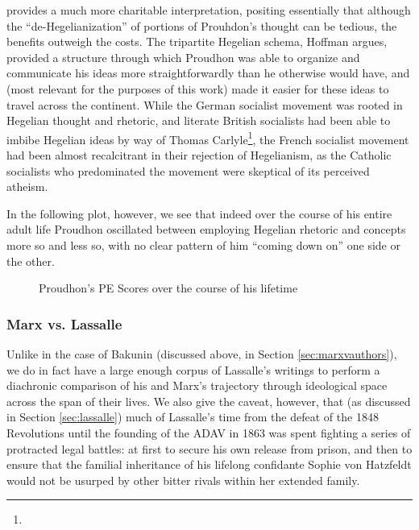 \cite{hoffman_revolutionary_1972} provides a much more charitable interpretation, positing essentially that although the ``de-Hegelianization'' of portions of Prouhdon's thought can be tedious, the benefits outweigh the costs. The tripartite Hegelian schema, Hoffman argues, provided a structure through which Proudhon was able to organize and communicate his ideas more straightforwardly than he otherwise would have, and (most relevant for the purposes of this work) made it easier for these ideas to travel across the continent. While the German socialist movement was rooted in Hegelian thought and rhetoric, and literate British socialists had been able to imbibe Hegelian ideas by way of Thomas Carlyle\footnote{}, the French socialist movement had been almost recalcitrant in their rejection of Hegelianism, as the Catholic socialists who predominated the movement were skeptical of its perceived atheism.

In the following plot, however, we see that indeed over the course of his entire adult life Proudhon oscillated between employing Hegelian rhetoric and concepts more so and less so, with no clear pattern of him ``coming down on'' one side or the other.

\begin{figure}[ht!]
    \centering
    
    \caption{Proudhon's PE Scores over the course of his lifetime}
    \label{fig:proudhonpescores}
\end{figure}


\subsubsection{Marx vs. Lassalle\label{sec:marxvlassalle}}

Unlike in the case of Bakunin (discussed above, in Section \ref{sec:marxvauthors}), we do in fact have a large enough corpus of Lassalle's writings to perform a diachronic comparison of his and Marx's trajectory through ideological space across the span of their lives. We also give the caveat, however, that (as discussed in Section \ref{sec:lassalle}) much of Lassalle's time from the defeat of the 1848 Revolutions until the founding of the ADAV in 1863 was spent fighting a series of protracted legal battles: at first to secure his own release from prison, and then to ensure that the familial inheritance of his lifelong confidante Sophie von Hatzfeldt would not be usurped by other bitter rivals within her extended family.

